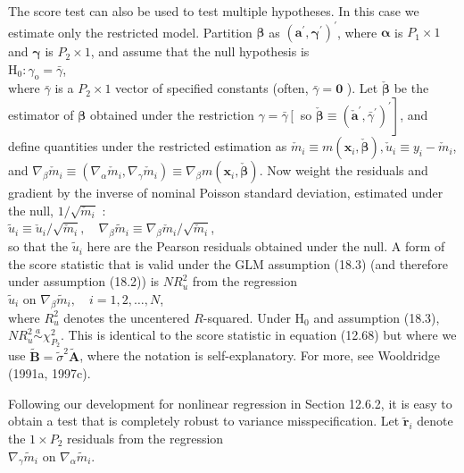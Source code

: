 \documentclass[10pt]{article}
\begin{document}
The score test can also be used to test multiple hypotheses. In this case we estimate only the restricted model. Partition $\boldsymbol{\beta}$ as $\left(\boldsymbol{a}^{\prime}, \boldsymbol{\gamma}^{\prime}\right)^{\prime}$, where $\boldsymbol{\alpha}$ is $P_{1} \times 1$ and $\boldsymbol{\gamma}$ is $P_{2} \times 1$, and assume that the null hypothesis is\\
$\mathrm{H}_{0}: \gamma_{\mathrm{o}}=\bar{\gamma}$,\\
where $\bar{\gamma}$ is a $P_{2} \times 1$ vector of specified constants (often, $\bar{\gamma}=\mathbf{0}$ ). Let $\check{\boldsymbol{\beta}}$ be the estimator of $\boldsymbol{\beta}$ obtained under the restriction $\gamma=\bar{\gamma}\left[\right.$ so $\left.\check{\boldsymbol{\beta}} \equiv\left(\check{\boldsymbol{a}}^{\prime}, \bar{\gamma}^{\prime}\right)^{\prime}\right]$, and define quantities under the restricted estimation as $\check{m}_{i} \equiv m\left(\mathbf{x}_{i}, \check{\boldsymbol{\beta}}\right), \check{u}_{i} \equiv y_{i}-\check{m}_{i}$, and $\nabla_{\beta} \check{m}_{i} \equiv\left(\nabla_{\alpha} \check{m}_{i}, \nabla_{\gamma} \check{m}_{i}\right) \equiv \nabla_{\beta} m\left(\mathbf{x}_{i}, \check{\boldsymbol{\beta}}\right)$. Now weight the residuals and gradient by the inverse of nominal Poisson standard deviation, estimated under the null, $1 / \sqrt{\check{m}_{i}}$ :\\
$\tilde{u}_{i} \equiv \check{u}_{i} / \sqrt{\check{m}_{i}}, \quad \nabla_{\beta} \tilde{m}_{i} \equiv \nabla_{\beta} \check{m}_{i} / \sqrt{\check{m}_{i}}$,\\
so that the $\tilde{u}_{i}$ here are the Pearson residuals obtained under the null. A form of the score statistic that is valid under the GLM assumption (18.3) (and therefore under assumption (18.2)) is $N R_{u}^{2}$ from the regression\\
$\tilde{u}_{i}$ on $\nabla_{\beta} \tilde{m}_{i}, \quad i=1,2, \ldots, N$,\\
where $R_{u}^{2}$ denotes the uncentered $R$-squared. Under $\mathrm{H}_{0}$ and assumption (18.3), $N R_{u}^{2} \stackrel{a}{\sim} \chi_{P_{2}}^{2}$. This is identical to the score statistic in equation (12.68) but where we use $\tilde{\mathbf{B}}=\tilde{\sigma}^{2} \tilde{\mathbf{A}}$, where the notation is self-explanatory. For more, see Wooldridge (1991a, 1997c).

Following our development for nonlinear regression in Section 12.6.2, it is easy to obtain a test that is completely robust to variance misspecification. Let $\tilde{\mathbf{r}}_{i}$ denote the $1 \times P_{2}$ residuals from the regression\\
$\nabla_{\gamma} \tilde{m}_{i}$ on $\nabla_{\alpha} \tilde{m}_{i}$.
\end{document}
